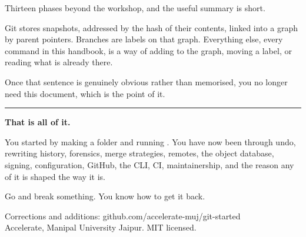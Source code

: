 \documentclass[11pt]{article}
\begin{document}
Thirteen phases beyond the workshop, and the useful summary is short.

Git stores snapshots, addressed by the hash of their contents, linked into a graph by
parent pointers. Branches are labels on that graph. Everything else, every command in
this handbook, is a way of adding to the graph, moving a label, or reading what is
already there.

Once that sentence is genuinely obvious rather than memorised, you no longer need
this document, which is the point of it.


\vspace{1.5em}
{\color{rhaccent}\rule{\linewidth}{2.5pt}}
\vspace{0.5em}

{\sffamily\small\color{rhslate}\textbf{That is all of it.}}

You started by making a folder and running . You have now been through
undo, rewriting history, forensics, merge strategies, remotes, the object database,
signing, configuration, GitHub, the CLI, CI, maintainership, and the reason any of it
is shaped the way it is.

Go and break something. You know how to get it back.

\vspace{1em}
{\sffamily\scriptsize\color{rhmuted}
Corrections and additions: github.com/accelerate-muj/git-started\\
Accelerate, Manipal University Jaipur. MIT licensed.}
\end{document}
